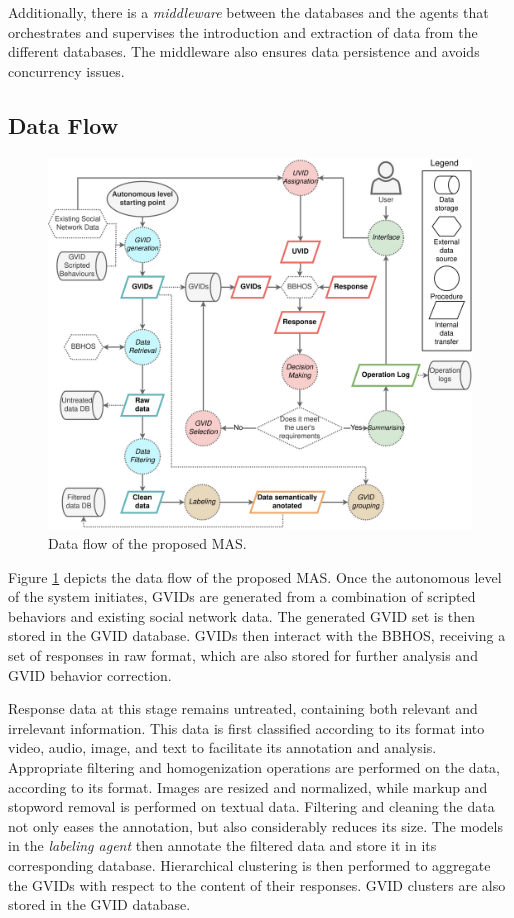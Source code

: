 Additionally, there is a \textit{middleware} between the databases and the agents that orchestrates and supervises the introduction and extraction of data from the different databases. The middleware also ensures data persistence and avoids concurrency issues.

\subsection{Data Flow}\label{6_sec:subsec:data_flow}

\begin{figure}[t]
    \centering
    \includegraphics[width=\linewidth]{6_kbsextractiondl/figures/Data_flow.eps}
    \caption{Data flow of the proposed MAS. }
    \label{fig:data_flow_mas}
\end{figure}

Figure \ref{fig:data_flow_mas} depicts the data flow of the proposed MAS. Once the autonomous level of the system initiates, GVIDs are generated from a combination of scripted behaviors and existing social network data. The generated GVID set is then stored in the GVID database. GVIDs then interact with the BBHOS, receiving a set of responses in raw format, which are also stored for further analysis and GVID behavior correction. 

Response data at this stage remains untreated, containing both relevant and irrelevant information. This data is first classified according to its format into video, audio, image, and text to facilitate its annotation and analysis. Appropriate filtering and homogenization operations are performed on the data, according to its format. Images are resized and normalized, while markup and stopword removal is performed on textual data. Filtering and cleaning the data not only eases the annotation, but also considerably reduces its size. The models in the \textit{labeling agent} then annotate the filtered data and store it in its corresponding database. Hierarchical clustering is then performed to aggregate the GVIDs with respect to the content of their responses. GVID clusters are also stored in the GVID database.

